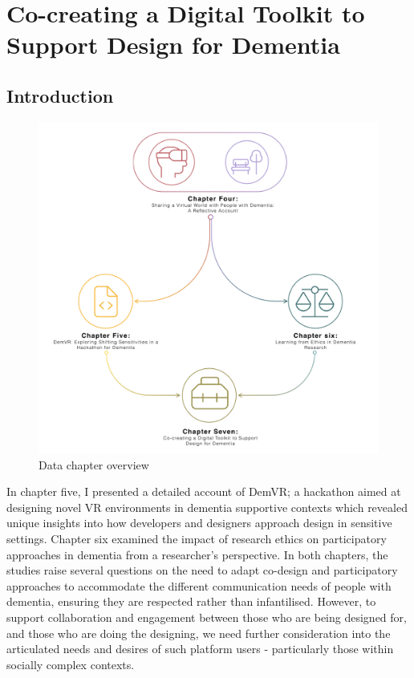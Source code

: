 \chapter{Co-creating a Digital Toolkit to Support Design for Dementia}
\label{D3}

\section{Introduction}
\label{D3:intro}
\begin{figure}[htp]
\centering
\includegraphics[width=0.6\linewidth]{Images/Thesis_Narrative/Narrative_Full.png}
\caption{Data chapter overview}
\label{fig:Thesis_Overview}
\end{figure}

In chapter five, I presented a detailed account of DemVR; a hackathon aimed at designing novel VR environments in dementia supportive contexts which revealed unique insights into how developers and designers approach design in sensitive settings. Chapter six examined the impact of research ethics on participatory approaches in dementia from a researcher's perspective. In both chapters, the studies raise several questions on the need to adapt co-design and participatory approaches to accommodate the different communication needs of people with dementia, ensuring they are respected rather than infantilised. However, to support collaboration and engagement between those who are being designed for, and those who are doing the designing, we need further consideration into the articulated needs and desires of such platform users - particularly those within socially complex contexts. 

